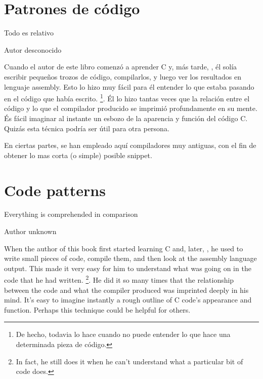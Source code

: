 \ifdefined\SPANISH
\part{Patrones de código}

\epigraph{Todo es relativo}{Autor desconocido}

Cuando el autor de este libro comenzó a aprender C y, más tarde, \Cpp, él solía escribir pequeños trozos de código, compilarlos, 
y luego ver los resultados en lenguaje assembly. Esto lo hizo muy fácil para él entender lo que estaba pasando en el código que había escrito.
\footnote{De hecho, todavia lo hace cuando no puede entender lo que hace una determinada pieza de código.}. 
Él lo hizo tantas veces que la relación entre el código \CCpp y lo que el compilador producido se imprimió profundamente en su mente. 
És fácil imaginar al instante un esbozo de la aparencia y función del código C. 
Quizás esta técnica podría ser útil para otra persona.


En ciertas partes, se han empleado aquí compiladores muy antiguas, con el fin de obtener lo mas corta (o simple) posible snippet.
\fi %

\ifdefined\ENGLISH
\part{Code patterns}

\epigraph{Everything is comprehended in comparison}{Author unknown}


When the author of this book first started learning C and, later, \Cpp, he used to write small pieces of code, compile them, 
and then look at the assembly language output. This made it very easy for him to understand what was going on in the code that he had written.
\footnote{In fact, he still does it when he can't understand what a particular bit of code does.}. 
He did it so many times that the relationship between the \CCpp code and what the compiler produced was imprinted deeply in his mind. 
It's easy to imagine instantly a rough outline of C code's appearance and function. 
Perhaps this technique could be helpful for others.


